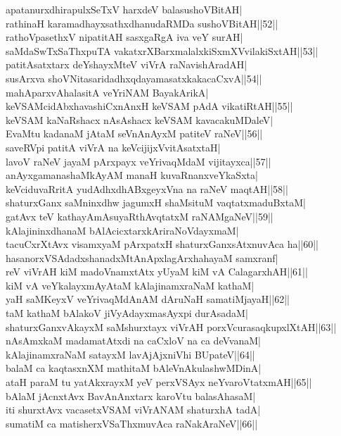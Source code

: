 \documentclass{article}
\begin{document}
apatanurxdhirapulxSeTxV harxdeV balasushoVBitAH|\\
rathinaH karamadhayxsathxdhanudaRMDa sushoVBitAH||52||\\
rathoVpasethxV nipatitAH sasxgaRgA iva veY surAH|\\
saMdaSwTxSaThxpuTA vakatxrXBarxmalalxkiSxmXVvilakiSxtAH||53||\\
patitAsatxtarx deYshayxMteV viVrA raNavishAradAH|\\
susArxva shoVNitasaridadhxqdayamasatxkakacaCxvA||54||\\
mahAparxvAhalasitA veYriNAM BayakArikA|\\
keVSAMcidAbxhavashiCxnAnxH keVSAM pAdA vikatiRtAH||55||\\
keVSAM kaNaRshacx nAsAshacx keVSAM kavacakuMDaleV|\\
EvaMtu kadanaM jAtaM seVnAnAyxM patiteV raNeV||56||\\
saveRVpi patitA viVrA na keVcijijxVvitAsatxtaH|\\
lavoV raNeV jayaM pArxpayx veYrivaqMdaM vijitayxca||57||\\
anAyxgamanashaMkAyAM manaH kuvaRnanxveYkaSxta|\\
keVciduvaRritA yudAdhxdhABxgeyxVna na raNeV maqtAH||58||\\
shaturxGanx saMninxdhw jagumxH shaMsituM vaqtatxmaduBxtaM|\\
gatAvx teV kathayAmAsuyaRthAvqtatxM raNAMgaNeV||59||\\
kAlajininxdhanaM bAlAcicxtarxkAriraNoVdayxmaM|\\
tacuCxrXtAvx visamxyaM pArxpatxH shaturxGanxsAtxnuvAca ha||60||\\
hasanorxVSAdadxshanadxMtAnApxlagArxhahayaM samxranf|\\
reV viVrAH kiM madoVnamxtAtx yUyaM kiM vA CalagarxhAH||61||\\
kiM vA veYkalayxmAyAtaM kAlajinamxraNaM kathaM|\\
yaH saMKeyxV veYrivaqMdAnAM dAruNaH samatiMjayaH||62||\\
taM kathaM bAlakoV jiVyAdayxmasAyxpi durAsadaM|\\
shaturxGanxvAkayxM saMshurxtayx viVrAH porxVcurasaqkupxlXtAH||63||\\
nAsAmxkaM madamatAtxdi na caCxloV na ca deVvanaM|\\
kAlajinamxraNaM satayxM lavAjAjxniVhi BUpateV||64||\\
balaM ca kaqtasxnXM mathitaM bAleVnAkulashwMDinA|\\
ataH paraM tu yatAkxrayxM yeV perxVSAyx neYvaroVtatxmAH||65||\\
bAlaM jAcnxtAvx BavAnAnxtarx karoVtu balasAhasaM|\\
iti shurxtAvx vacasetxVSAM viVrANAM shaturxhA tadA|\\
sumatiM ca matisherxVSaThxmuvAca raNakAraNeV||66||\\
\end{document}
